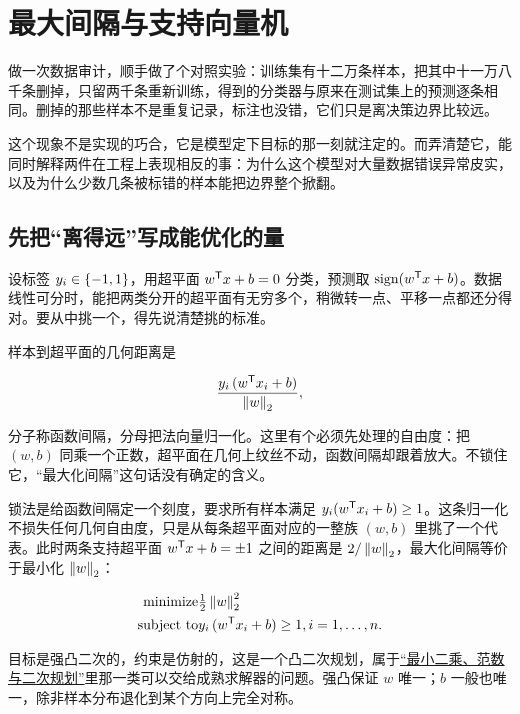 \section{最大间隔与支持向量机}
\label{sec:09-Convex-Optimization/07-Applications/03}

做一次数据审计，顺手做了个对照实验：训练集有十二万条样本，把其中十一万八千条删掉，只留两千条重新训练，得到的分类器与原来在测试集上的预测逐条相同。删掉的那些样本不是重复记录，标注也没错，它们只是离决策边界比较远。

这个现象不是实现的巧合，它是模型定下目标的那一刻就注定的。而弄清楚它，能同时解释两件在工程上表现相反的事：为什么这个模型对大量数据错误异常皮实，以及为什么少数几条被标错的样本能把边界整个掀翻。

\subsection{先把``离得远''写成能优化的量}

设标签 \(y_i\in\left\{-1,1\right\}\)，用超平面 \(w^{\mathsf{T}}x+b=0\) 分类，预测取 \(\operatorname{sign}(w^{\mathsf{T}}x+b)\)。数据线性可分时，能把两类分开的超平面有无穷多个，稍微转一点、平移一点都还分得对。要从中挑一个，得先说清楚挑的标准。

样本到超平面的几何距离是

\[
\frac{y_i\,(w^{\mathsf{T}}x_i+b)}{\left\lVert w\right\rVert_2},
\]

分子称函数间隔，分母把法向量归一化。这里有个必须先处理的自由度：把 \((w,b)\) 同乘一个正数，超平面在几何上纹丝不动，函数间隔却跟着放大。不锁住它，``最大化间隔''这句话没有确定的含义。

锁法是给函数间隔定一个刻度，要求所有样本满足 \(y_i(w^{\mathsf{T}}x_i+b)\ge1\)。这条归一化不损失任何几何自由度，只是从每条超平面对应的一整族 \((w,b)\) 里挑了一个代表。此时两条支持超平面 \(w^{\mathsf{T}}x+b=\pm1\) 之间的距离是 \(2/\left\lVert w\right\rVert_2\)，最大化间隔等价于最小化 \(\left\lVert w\right\rVert_2\)：

\[
\begin{aligned}
\text{minimize}\space & \tfrac12\left\lVert w\right\rVert_2^2\\
\text{subject to}\space & y_i\,(w^{\mathsf{T}}x_i+b)\ge1,\space i=1,\dots,n .
\end{aligned}
\]

目标是强凸二次的，约束是仿射的，这是一个凸二次规划，属于\hyperref[sec:09-Convex-Optimization/04-Convex-Problems/02]{``最小二乘、范数与二次规划''}里那一类可以交给成熟求解器的问题。强凸保证 \(w\) 唯一；\(b\) 一般也唯一，除非样本分布退化到某个方向上完全对称。

